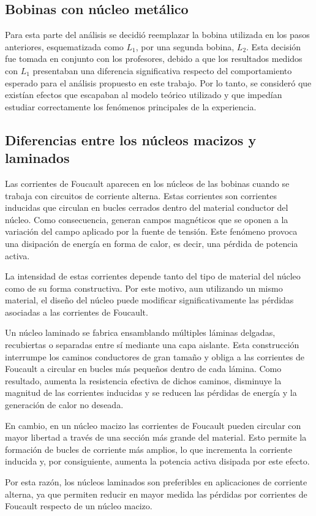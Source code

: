 \subsection{Bobinas con núcleo metálico}

Para esta parte del análisis se decidió reemplazar la bobina utilizada en los pasos anteriores, esquematizada como \(L_1\), por una segunda bobina, \(L_2\). Esta decisión fue tomada en conjunto con los profesores, debido a que los resultados medidos con \(L_1\) presentaban una diferencia significativa respecto del comportamiento esperado para el análisis propuesto en este trabajo. Por lo tanto, se consideró que existían efectos que escapaban al modelo teórico utilizado y que impedían estudiar correctamente los fenómenos principales de la experiencia.

\subsection{Diferencias entre los núcleos macizos y laminados}

Las corrientes de Foucault aparecen en los núcleos de las bobinas cuando se trabaja con circuitos de corriente alterna. Estas corrientes son corrientes inducidas que circulan en bucles cerrados dentro del material conductor del núcleo. Como consecuencia, generan campos magnéticos que se oponen a la variación del campo aplicado por la fuente de tensión. Este fenómeno provoca una disipación de energía en forma de calor, es decir, una pérdida de potencia activa.

La intensidad de estas corrientes depende tanto del tipo de material del núcleo como de su forma constructiva. Por este motivo, aun utilizando un mismo material, el diseño del núcleo puede modificar significativamente las pérdidas asociadas a las corrientes de Foucault.

Un núcleo laminado se fabrica ensamblando múltiples láminas delgadas, recubiertas o separadas entre sí mediante una capa aislante. Esta construcción interrumpe los caminos conductores de gran tamaño y obliga a las corrientes de Foucault a circular en bucles más pequeños dentro de cada lámina. Como resultado, aumenta la resistencia efectiva de dichos caminos, disminuye la magnitud de las corrientes inducidas y se reducen las pérdidas de energía y la generación de calor no deseada.

En cambio, en un núcleo macizo las corrientes de Foucault pueden circular con mayor libertad a través de una sección más grande del material. Esto permite la formación de bucles de corriente más amplios, lo que incrementa la corriente inducida y, por consiguiente, aumenta la potencia activa disipada por este efecto.

Por esta razón, los núcleos laminados son preferibles en aplicaciones de corriente alterna, ya que permiten reducir en mayor medida las pérdidas por corrientes de Foucault respecto de un núcleo macizo.
